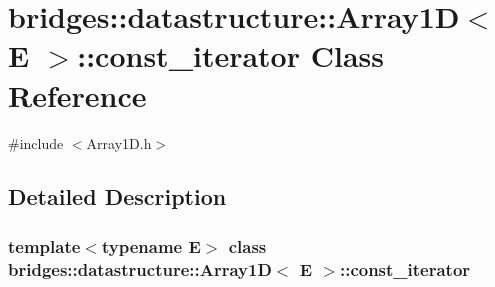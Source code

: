 \hypertarget{classbridges_1_1datastructure_1_1_array1_d_1_1const__iterator}{}\section{bridges\+::datastructure\+::Array1D$<$ E $>$\+::const\+\_\+iterator Class Reference}
\label{classbridges_1_1datastructure_1_1_array1_d_1_1const__iterator}


{\ttfamily \#include $<$Array1\+D.\+h$>$}



\subsection{Detailed Description}
\subsubsection*{template$<$typename E$>$\newline
class bridges\+::datastructure\+::\+Array1\+D$<$ E $>$\+::const\+\_\+iterator}

